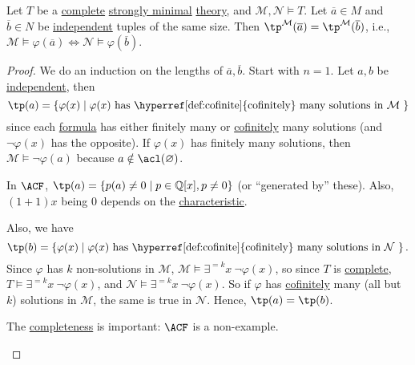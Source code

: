 \begin{lemma}
	Let \(T\) be a \hyperref[def:theory-complete]{complete} \hyperref[def:strongly-minimal]{strongly minimal} \hyperref[def:theory]{theory}, and \(\mathcal{M} , \mathcal{N} \models T\). Let \(\overline{a} \in M\) and \(\overline{b} \in N\) be \hyperref[def:independent]{independent} tuples of the same size. Then \(\tp^{\mathcal{M} }(\overline{a} ) = \tp^{\mathcal{M} }(\overline{b} )\), i.e., \(\mathcal{M} \models \varphi (\overline{a} ) \iff \mathcal{N} \models \varphi (\overline{b} )\).
\end{lemma}
\begin{proof}
	We do an induction on the lengths of \(\overline{a} , \overline{b} \). Start with \(n = 1\). Let \(a, b\) be \hyperref[def:independent]{independent}, then
	\[
		\tp(a) = \left\{ \varphi (x) \mid \text{\(\varphi (x)\) has \hyperref[def:cofinite]{cofinitely} many solutions in \(\mathcal{M} \) }\right\}
	\]
	since each \hyperref[def:formula]{formula} has either finitely many or \hyperref[def:cofinite]{cofinitely} many solutions (and \(\lnot \varphi (x)\) has the opposite). If \(\varphi (x)\) has finitely many solutions, then \(\mathcal{M} \models \lnot \varphi (a)\) because \(a \notin \acl(\varnothing )\).

	\begin{eg}
		In \(\ACF\), \(\tp(a) = \left\{ p(a) \neq 0 \mid p\in \mathbb{Q} [x], p \neq 0 \right\} \) (or ``generated by'' these). Also, \((1 + 1) x\) being \(0\) depends on the \hyperref[def:characteristic]{characteristic}.
	\end{eg}

	Also, we have
	\[
		\tp(b) = \left\{ \varphi (x) \mid \text{\(\varphi (x)\) has \hyperref[def:cofinite]{cofinitely} many solutions in \(\mathcal{N} \) }\right\}.
	\]
	Since \(\varphi \) has \(k\) non-solutions in \(\mathcal{M} \), \(\mathcal{M} \models \exists ^{=k} x\ \lnot \varphi (x)\), so since \(T\) is \hyperref[def:theory-complete]{complete}, \(T \models \exists ^{=k} x\ \lnot \varphi (x)\), and \(\mathcal{N} \models \exists ^{=k} x\ \lnot \varphi (x)\). So if \(\varphi \) has \hyperref[def:cofinite]{cofinitely} many (all but \(k\)) solutions in \(\mathcal{M} \), the same is true in \(\mathcal{N} \). Hence, \(\tp(a) = \tp(b)\).

	\begin{eg}
		The \hyperref[def:theory-complete]{completeness} is important: \(\ACF\) is a non-example.
	\end{eg}


\end{proof}
